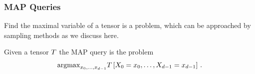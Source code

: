 
%
%
%






\subsubsection{MAP Queries}

Find the maximal variable of a tensor is a problem, which can be approached by sampling methods as we discuss here.

\begin{definition}
	Given a tensor $T$ the MAP query is the problem 
	\begin{align}
		\mathrm{argmax}_{x_{0},\ldots,x_{d-1}} T\left[X_{0}=x_{0},\ldots,X_{d-1}=x_{d-1}\right] \, .
	\end{align}
\end{definition}


